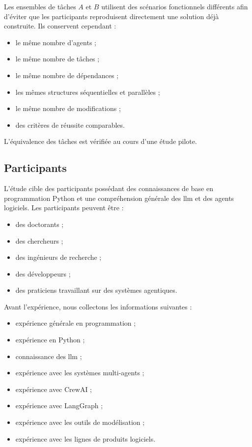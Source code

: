 Les ensembles de tâches $A$ et $B$ utilisent des scénarios fonctionnels
différents afin d'éviter que les participants reproduisent directement
une solution déjà construite. Ils conservent cependant :

\begin{itemize}
    \item le même nombre d'agents ;
    \item le même nombre de tâches ;
    \item le même nombre de dépendances ;
    \item les mêmes structures séquentielles et parallèles ;
    \item le même nombre de modifications ;
    \item des critères de réussite comparables.
\end{itemize}

L'équivalence des tâches est vérifiée au cours d'une étude pilote.


\subsection{Participants}
\label{subsec:participants}

L'étude cible des participants possédant des connaissances de base en
programmation Python et une compréhension générale des \gls{llm} et des
agents logiciels. Les participants peuvent être :

\begin{itemize}
    \item des doctorants ;
    \item des chercheurs ;
    \item des ingénieurs de recherche ;
    \item des développeurs ;
    \item des praticiens travaillant sur des systèmes agentiques.
\end{itemize}

Avant l'expérience, nous collectons les informations suivantes :

\begin{itemize}
    \item expérience générale en programmation ;
    \item expérience en Python ;
    \item connaissance des \gls{llm} ;
    \item expérience avec les systèmes multi-agents ;
    \item expérience avec CrewAI ;
    \item expérience avec LangGraph ;
    \item expérience avec les outils de modélisation ;
    \item expérience avec les lignes de produits logiciels.
\end{itemize}

